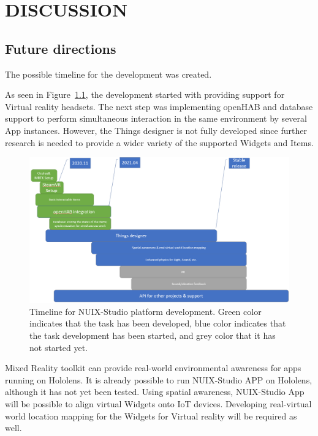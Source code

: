 
\chapter{DISCUSSION}

\section{Future directions}

The possible timeline for the development was created.

As seen in Figure~\ref{fig:Timeline-figure}, the development started with providing support for Virtual reality headsets. The next step was implementing openHAB and database support to perform simultaneous interaction in the same environment by several App instances. However, the Things designer is not fully developed since further research is needed to provide a wider variety of the supported Widgets and Items.

\begin{figure}
  \centering
  \includegraphics[width=0.9\linewidth]{figures/Timeline.png}
  \caption{Timeline for NUIX-Studio platform development. Green color indicates that the task has been developed, blue color indicates that the task development has been started, and grey color that it has not started yet.}
  \label{fig:Timeline-figure}
\end{figure}

Mixed Reality toolkit can provide real-world environmental awareness for apps running on Hololens. It is already possible to run NUIX-Studio APP on Hololens, although it has not yet been tested. Using spatial awareness, NUIX-Studio App will be possible to align virtual Widgets onto IoT devices. Developing real-virtual world location mapping for the Widgets for Virtual reality will be required as well.

